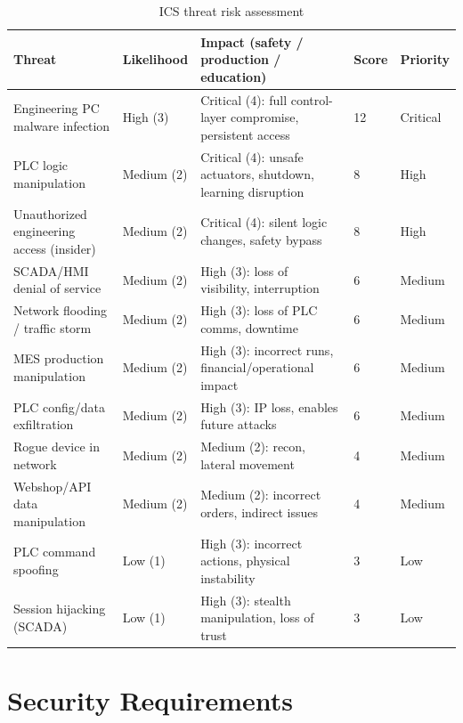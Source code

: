 \documentclass[11pt,a4paper]{article}
\begin{document}
{\small
\setlength{\tabcolsep}{4pt}
\begin{longtable}{L{4.0cm} L{1.8cm} L{6.0cm} L{1.4cm} L{1.6cm}}
\caption{ICS threat risk assessment}\\
\toprule
\textbf{Threat} & \textbf{Likelihood} & \textbf{Impact (safety / production / education)} & \textbf{Score} & \textbf{Priority} \\
\midrule \endhead
Engineering PC malware infection & High (3) & Critical (4): full control-layer compromise, persistent access & 12 & Critical \\
PLC logic manipulation & Medium (2) & Critical (4): unsafe actuators, shutdown, learning disruption & 8 & High \\
Unauthorized engineering access (insider) & Medium (2) & Critical (4): silent logic changes, safety bypass & 8 & High \\
SCADA/HMI denial of service & Medium (2) & High (3): loss of visibility, interruption & 6 & Medium \\
Network flooding / traffic storm & Medium (2) & High (3): loss of PLC comms, downtime & 6 & Medium \\
MES production manipulation & Medium (2) & High (3): incorrect runs, financial/operational impact & 6 & Medium \\
PLC config/data exfiltration & Medium (2) & High (3): IP loss, enables future attacks & 6 & Medium \\
Rogue device in network & Medium (2) & Medium (2): recon, lateral movement & 4 & Medium \\
Webshop/API data manipulation & Medium (2) & Medium (2): incorrect orders, indirect issues & 4 & Medium \\
PLC command spoofing & Low (1) & High (3): incorrect actions, physical instability & 3 & Low \\
Session hijacking (SCADA) & Low (1) & High (3): stealth manipulation, loss of trust & 3 & Low \\
\bottomrule
\end{longtable}
}



\section{Security Requirements}\label{sec:secreq}

\end{document}

